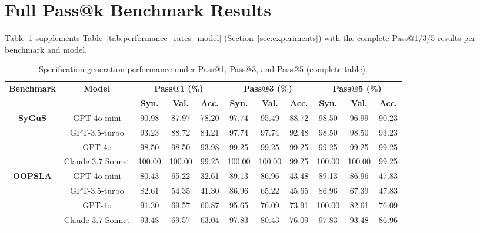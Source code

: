 \section{Full Pass@k Benchmark Results}
\label{app:rq2-full}

Table~\ref{tab:performance_rates_model_full} supplements Table~\ref{tab:performance_rates_model} (Section~\ref{sec:experiments}) with the complete Pass@1/3/5 results per benchmark and model.

\begin{table}[t]
\centering
\caption{Specification generation performance under Pass@1, Pass@3, and Pass@5 (complete table).}
\label{tab:performance_rates_model_full}

\setlength{\tabcolsep}{2pt}
\begin{adjustbox}{max width=\textwidth}
\begin{tabular}{cc ccc ccc ccc}
\toprule
\multirow{2}{*}{\textbf{Benchmark}} & \multirow{2}{*}{\textbf{Model}}
& \multicolumn{3}{c}{\textbf{Pass@1 (\%)}}
& \multicolumn{3}{c}{\textbf{Pass@3 (\%)}}
& \multicolumn{3}{c}{\textbf{Pass@5 (\%)}} \\
\cmidrule(lr){3-5} \cmidrule(lr){6-8} \cmidrule(lr){9-11}
& & \textbf{Syn.} & \textbf{Val.} & \textbf{Acc.}
& \textbf{Syn.} & \textbf{Val.} & \textbf{Acc.}
& \textbf{Syn.} & \textbf{Val.} & \textbf{Acc.} \\
\midrule

\multirow{4}{*}{\textbf{SyGuS}}
 & GPT-4o-mini & 90.98 & 87.97 & 78.20 & 97.74 & 95.49 & 88.72 & 98.50 & 96.99 & 90.23 \\
 & GPT-3.5-turbo & 93.23 & 88.72 & 84.21 & 97.74 & 97.74 & 92.48 & 98.50 & 98.50 & 93.23 \\
 & GPT-4o & 98.50 & 98.50 & 93.98 & 99.25 & 99.25 & 99.25 & 99.25 & 99.25 & 99.25 \\
 & Claude 3.7 Sonnet & 100.00 & 100.00 & 99.25 & 100.00 & 100.00 & 99.25 & 100.00 & 100.00 & 99.25 \\
    \midrule

\multirow{4}{*}{\textbf{OOPSLA}}
 & GPT-4o-mini & 80.43 & 65.22 & 32.61 & 89.13 & 86.96 & 43.48 & 89.13 & 86.96 & 47.83 \\
 & GPT-3.5-turbo & 82.61 & 54.35 & 41.30 & 86.96 & 65.22 & 45.65 & 86.96 & 67.39 & 47.83 \\
 & GPT-4o & 91.30 & 69.57 & 60.87 & 95.65 & 76.09 & 73.91 & 100.00 & 82.61 & 76.09 \\
 & Claude 3.7 Sonnet & 93.48 & 69.57 & 63.04 & 97.83 & 80.43 & 76.09 & 97.83 & 93.48 & 86.96 \\
\midrule


\end{tabular}
\end{adjustbox}
\end{table}
